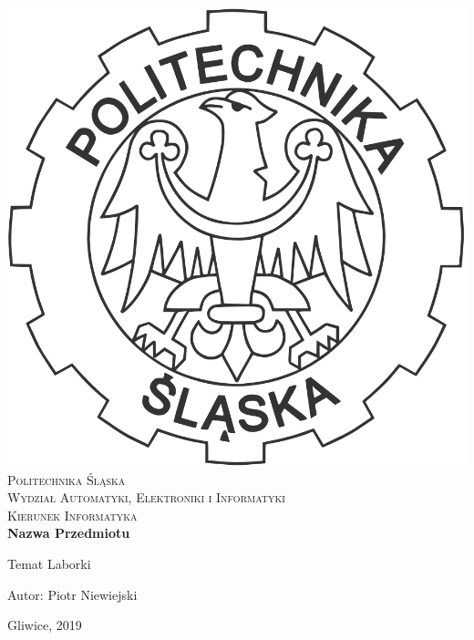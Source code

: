 
\newpage
\thispagestyle{empty}

\begin{onehalfspacing}
	\begin{center}

		\centering
		\includegraphics[keepaspectratio,scale=0.1]{./figures/godlo.PNG}
		\\[.8cm]

		{\fontsize{17}{17}\selectfont
		\textsc{Politechnika Śląska \\[.3cm]
			Wydział Automatyki, Elektroniki i Informatyki  \\[.3cm]
			Kierunek Informatyka  \\[2.5cm]}
		\textbf{Nazwa Przedmiotu  \\[1.7cm]}}

		\Large
		{Temat Laborki}\\[2.3cm]


		\vfill

		\large
		\begin{flushleft}
			Autor: Piotr Niewiejski
		\end{flushleft}
		Gliwice, 2019

	\end{center}
\end{onehalfspacing}

\singlespacing

\thispagestyle{empty}
\mbox{}

\newpage

\setcounter{tocdepth}{2}

{\hypersetup{linkcolor=black}
	\tableofcontents
}


